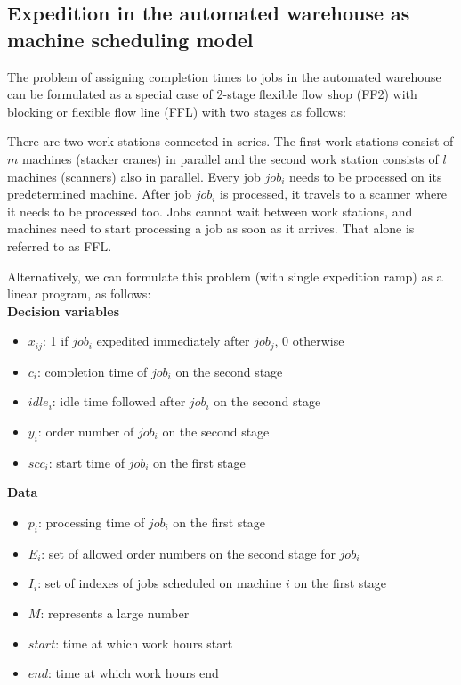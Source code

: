 \documentclass{ctuthesis}
\begin{document}
\subsection{Expedition in the automated warehouse as machine scheduling model}

The problem of assigning completion times to jobs in the automated warehouse can be formulated as a special case of 2-stage flexible flow shop (FF2) with blocking or flexible flow line (FFL) with two stages as follows:

There are two work stations connected in series. The first work stations consist of $m$ machines (stacker cranes) in parallel and the second work station consists of $l$ machines (scanners) also in parallel. Every job $job_i$ needs to be processed on its predetermined machine. After job $job_i$ is processed, it travels to a scanner where it needs to be processed too. Jobs cannot wait between work stations, and machines need to start processing a job as soon as it arrives. That alone is referred to as FFL.

Alternatively, we can formulate this problem (with single expedition ramp) as a linear program, as follows:\\
\textbf{Decision variables}

\begin{itemize}
\item $x_{ij}$: 1 if $job_i$ expedited immediately after $job_j$, 0 otherwise
\item$c_i$: completion time of $job_i$ on the second stage
\item$idle_i$: idle time followed after $job_i$ on the second stage
\item$y_i$: order number of $job_i$ on the second stage
\item$scc_i$: start time of $job_i$ on the first stage 
\end{itemize}
\textbf{Data}
\begin{itemize}
\item$p_i$: processing time of $job_i$ on the first stage
\item$E_i$: set of allowed order numbers on the second stage for $job_i$
\item$I_i$: set of indexes of jobs scheduled on machine $i$ on the first stage
\item$M$: represents a large number
\item$start$: time at which work hours start
\item$end$: time at which work hours end
\end{itemize}
\end{document}
